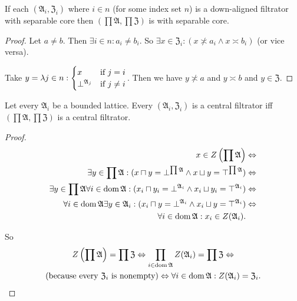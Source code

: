 \begin{prop}
If each $(\mathfrak{A}_{i},\mathfrak{Z}_{i})$ where $i\in n$ (for
some index set $n$) is a down-aligned
filtrator with separable core
then $\left(\prod\mathfrak{A},\prod\mathfrak{Z}\right)$ is with separable
core.\end{prop}
\begin{proof}
Let $a\neq b$. Then $\exists i\in n:a_{i}\neq b_{i}$. So $\exists x\in\mathfrak{Z}_{i}:(x\nasymp a_{i}\wedge x\asymp b_{i})$
(or vice versa).

Take $y=
\lambda j\in n:\begin{cases}
x &\text{if }j=i\\
\bot^{\mathfrak{A}_j} &\text{if }j\ne i
\end{cases}$. Then we have
$y\nasymp a$ and $y\asymp b$ and $y\in\mathfrak{Z}$.\end{proof}
\begin{prop}
Let every $\mathfrak{A}_{i}$ be a bounded lattice. Every $(\mathfrak{A}_{i},\mathfrak{Z}_{i})$
is a central filtrator iff $\left(\prod\mathfrak{A},\prod\mathfrak{Z}\right)$
is a central filtrator.\end{prop}
\begin{proof}
~
\begin{align*}
x\in Z\left(\prod\mathfrak{A}\right) & \Leftrightarrow\\
\exists y\in\prod\mathfrak{A}:(x\sqcap y=\bot^{\prod\mathfrak{A}}\land x\sqcup y=\top^{\prod\mathfrak{A}}) & \Leftrightarrow\\
\exists y\in\prod\mathfrak{A}\forall i\in\operatorname{dom}\mathfrak{A}:(x_{i}\sqcap y_{i}=\bot^{\mathfrak{A}_{i}}\land x_{i}\sqcup y_{i}=\top^{\mathfrak{A}_{i}}) & \Leftrightarrow\\
\forall i\in\operatorname{dom}\mathfrak{A}\exists y\in\mathfrak{A}_{i}:(x_{i}\sqcap y=\bot^{\mathfrak{A}_{i}}\land x_{i}\sqcup y=\top^{\mathfrak{A}_{i}}) & \Leftrightarrow\\
\forall i\in\operatorname{dom}\mathfrak{A}:x_{i}\in Z(\mathfrak{A}_{i}).
\end{align*}


So
\begin{multline*}
Z\left(\prod\mathfrak{A}\right)=\prod\mathfrak{Z}\Leftrightarrow\prod_{i\in\operatorname{dom}\mathfrak{A}}Z(\mathfrak{A}_{i})=\prod\mathfrak{Z}\Leftrightarrow\\
\text{(because every \ensuremath{\mathfrak{Z}_{i}} is nonempty)}\Leftrightarrow\forall i\in\operatorname{dom}\mathfrak{A}:Z(\mathfrak{A}_{i})=\mathfrak{Z}_{i}.
\end{multline*}
\end{proof}
